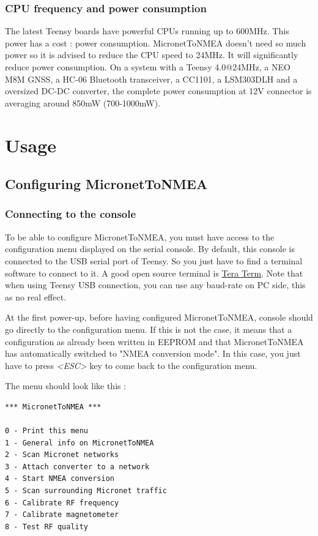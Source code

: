 \documentclass{report}
\begin{document}
\subsection{CPU frequency and power consumption}
The latest Teensy boards have powerful CPUs running up to 600MHz. This power has a cost : power consumption. MicronetToNMEA doesn't need so much power so it is advised to reduce the CPU speed to 24MHz. It will significantly reduce power consumption.
On a system with a Teensy 4.0@24MHz, a NEO M8M GNSS, a HC-06 Bluetooth transceiver, a CC1101, a LSM303DLH and a oversized DC-DC converter, the complete power consumption at 12V connector is averaging around 850mW (700-1000mW).

\chapter{Usage}

\section{Configuring MicronetToNMEA}

\subsection{Connecting to the console}

To be able to configure MicronetToNMEA, you must have access to the configuration menu displayed on the serial console. By default, this console is connected to the USB serial port of Teensy. So you just have to find a terminal software to connect to it. A good open source terminal is \href{http://www.teraterm.org/}{Tera Term}. Note that when using Teensy USB connection, you can use any baud-rate on PC side, this as no real effect.

At the first power-up, before having configured MicronetToNMEA, console should go directly to the configuration menu. If this is not the case, it means that a configuration as already been written in EEPROM and that MicronetToNMEA has automatically switched to "NMEA conversion mode". In this case, you just have to press \emph{<ESC>} key to come back to the configuration menu.

The menu should look like this :

\begin{verbatim}
*** MicronetToNMEA ***

0 - Print this menu
1 - General info on MicronetToNMEA
2 - Scan Micronet networks
3 - Attach converter to a network
4 - Start NMEA conversion
5 - Scan surrounding Micronet traffic
6 - Calibrate RF frequency
7 - Calibrate magnetometer
8 - Test RF quality
\end{verbatim}
\end{document}
